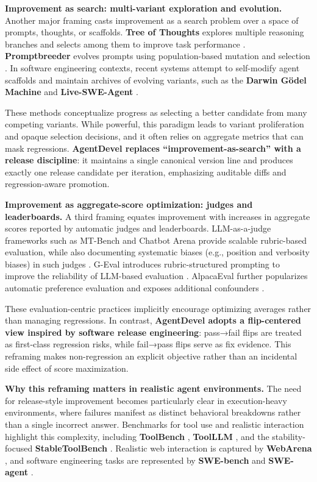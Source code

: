 \documentclass[11pt]{article}
\begin{document}
\textbf{Improvement as search: multi-variant exploration and evolution.} Another major framing casts improvement as a search problem over a space of prompts, thoughts, or scaffolds. \textbf{Tree of Thoughts} explores multiple reasoning branches and selects among them to improve task performance \cite{yao2023treeofthoughts}. \textbf{Promptbreeder} evolves prompts using population-based mutation and selection \cite{fernando2023promptbreeder}. In software engineering contexts, recent systems attempt to self-modify agent scaffolds and maintain archives of evolving variants, such as the \textbf{Darwin Gödel Machine} \cite{zhang2025darwingodel} and \textbf{Live-SWE-Agent} \cite{xia2025livesweagent}.

These methods conceptualize progress as selecting a better candidate from many competing variants. While powerful, this paradigm leads to variant proliferation and opaque selection decisions, and it often relies on aggregate metrics that can mask regressions. \textbf{AgentDevel replaces “improvement-as-search” with a release discipline}: it maintains a single canonical version line and produces exactly one release candidate per iteration, emphasizing auditable diffs and regression-aware promotion.

\textbf{Improvement as aggregate-score optimization: judges and leaderboards.} A third framing equates improvement with increases in aggregate scores reported by automatic judges and leaderboards. LLM-as-a-judge frameworks such as MT-Bench and Chatbot Arena provide scalable rubric-based evaluation, while also documenting systematic biases (e.g., position and verbosity biases) in such judges \cite{zheng2023judging}. G-Eval introduces rubric-structured prompting to improve the reliability of LLM-based evaluation \cite{liu-etal-2023-g}. AlpacaEval further popularizes automatic preference evaluation and exposes additional confounders \cite{tatsulab2023alpacaeval,dubois2024lengthcontrolledalpacaeval}.

These evaluation-centric practices implicitly encourage optimizing averages rather than managing regressions. In contrast, \textbf{AgentDevel adopts a flip-centered view inspired by software release engineering}: pass→fail flips are treated as first-class regression risks, while fail→pass flips serve as fix evidence. This reframing makes non-regression an explicit objective rather than an incidental side effect of score maximization.

\textbf{Why this reframing matters in realistic agent environments.} The need for release-style improvement becomes particularly clear in execution-heavy environments, where failures manifest as distinct behavioral breakdowns rather than a single incorrect answer. Benchmarks for tool use and realistic interaction highlight this complexity, including \textbf{ToolBench} \cite{xu2023toolbench}, \textbf{ToolLLM} \cite{qin2023toollm}, and the stability-focused \textbf{StableToolBench} \cite{guo-etal-2024-stabletoolbench}. Realistic web interaction is captured by \textbf{WebArena} \cite{zhou2023webarena}, and software engineering tasks are represented by \textbf{SWE-bench} \cite{jimenez2023swebench} and \textbf{SWE-agent} \cite{yang2024sweagent}.
\end{document}
